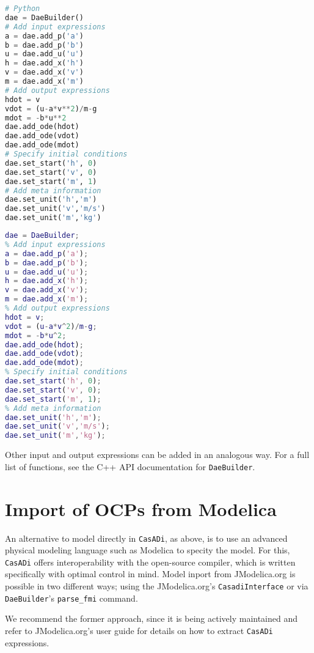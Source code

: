 \documentclass[a4paper,12pt]{book}
\newcommand{\CasADi}{\texttt{CasADi}\xspace}
\begin{document}
\begin{minipage}[t]{0.5\textwidth}
\begin{lstlisting}[language=Python]
# Python
dae = DaeBuilder()
# Add input expressions
a = dae.add_p('a')
b = dae.add_p('b')
u = dae.add_u('u')
h = dae.add_x('h')
v = dae.add_x('v')
m = dae.add_x('m')
# Add output expressions
hdot = v
vdot = (u-a*v**2)/m-g
mdot = -b*u**2
dae.add_ode(hdot)
dae.add_ode(vdot)
dae.add_ode(mdot)
# Specify initial conditions
dae.set_start('h', 0)
dae.set_start('v', 0)
dae.set_start('m', 1)
# Add meta information
dae.set_unit('h','m')
dae.set_unit('v','m/s')
dae.set_unit('m','kg')
\end{lstlisting}
\end{minipage}
\begin{minipage}[t]{0.5\textwidth}
\begin{lstlisting}[language=Matlab]
% MATLAB
dae = DaeBuilder;
% Add input expressions
a = dae.add_p('a');
b = dae.add_p('b');
u = dae.add_u('u');
h = dae.add_x('h');
v = dae.add_x('v');
m = dae.add_x('m');
% Add output expressions
hdot = v;
vdot = (u-a*v^2)/m-g;
mdot = -b*u^2;
dae.add_ode(hdot);
dae.add_ode(vdot);
dae.add_ode(mdot);
% Specify initial conditions
dae.set_start('h', 0);
dae.set_start('v', 0);
dae.set_start('m', 1);
% Add meta information
dae.set_unit('h','m');
dae.set_unit('v','m/s');
dae.set_unit('m','kg');
\end{lstlisting}
\end{minipage}

Other input and output expressions can be added in an analogous way. For a full
list of functions, see the C++ API documentation for \texttt{DaeBuilder}.

\section{Import of OCPs from Modelica} \label{sec:modelica}
An alternative to model directly in \CasADi, as above, is to use an advanced
physical modeling language such as Modelica to specity the model. For this,
\CasADi offers interoperability with the open-source  compiler, which
is written specifically with optimal control in mind. Model inport from
JModelica.org is possible in two different ways; using the JModelica.org's
\texttt{CasadiInterface} or via \texttt{DaeBuilder}'s
\lstinline[language=Python]{parse_fmi} command.

We recommend the former approach, since it is being actively maintained and
refer to JModelica.org's user guide for details on how to extract \CasADi
expressions.
\end{document}
